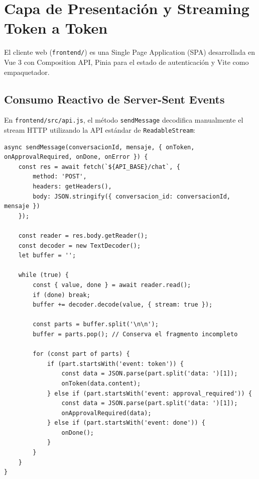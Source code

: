 \documentclass[11pt,a4paper]{article}
\begin{document}
\section{Capa de Presentación y Streaming Token a Token}

El cliente web (\texttt{frontend/}) es una Single Page Application (SPA) desarrollada en Vue 3 con Composition API, Pinia para el estado de autenticación y Vite como empaquetador.

\subsection{Consumo Reactivo de Server-Sent Events}
En \texttt{frontend/src/api.js}, el método \texttt{sendMessage} decodifica manualmente el stream HTTP utilizando la API estándar de \texttt{ReadableStream}:

\begin{lstlisting}[caption={Decodificación de chunks SSE en frontend/src/api.js}]
async sendMessage(conversacionId, mensaje, { onToken, onApprovalRequired, onDone, onError }) {
    const res = await fetch(`${API_BASE}/chat`, {
        method: 'POST',
        headers: getHeaders(),
        body: JSON.stringify({ conversacion_id: conversacionId, mensaje })
    });

    const reader = res.body.getReader();
    const decoder = new TextDecoder();
    let buffer = '';

    while (true) {
        const { value, done } = await reader.read();
        if (done) break;
        buffer += decoder.decode(value, { stream: true });

        const parts = buffer.split('\n\n');
        buffer = parts.pop(); // Conserva el fragmento incompleto

        for (const part of parts) {
            if (part.startsWith('event: token')) {
                const data = JSON.parse(part.split('data: ')[1]);
                onToken(data.content);
            } else if (part.startsWith('event: approval_required')) {
                const data = JSON.parse(part.split('data: ')[1]);
                onApprovalRequired(data);
            } else if (part.startsWith('event: done')) {
                onDone();
            }
        }
    }
}
\end{lstlisting}
\end{document}
